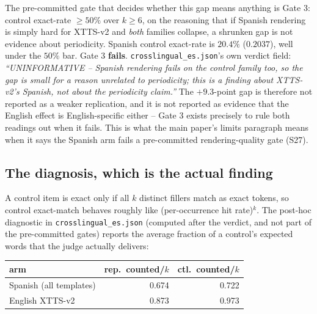 \documentclass[11pt]{article}
\begin{document}
\noindent The pre-committed gate that decides whether this gap means anything
is Gate 3: control exact-rate $\ge 50\%$ over $k\ge6$, on the reasoning that if
Spanish rendering is simply hard for XTTS-v2 and \emph{both} families
collapse, a shrunken gap is not evidence about periodicity. Spanish control
exact-rate is $20.4\%$ ($0.2037$), well under the $50\%$ bar. Gate 3
\textbf{fails}. \texttt{crosslingual\_es.json}'s own verdict field: \emph{
``UNINFORMATIVE -- Spanish rendering fails on the control family too, so the
gap is small for a reason unrelated to periodicity; this is a finding about
XTTS-v2's Spanish, not about the periodicity claim.''} The $+9.3$-point gap is
therefore not reported as a weaker replication, and it is not reported as
evidence that the English effect is English-specific either -- Gate 3 exists
precisely to rule both readings out when it fails. This is what the main
paper's limits paragraph means when it says the Spanish arm fails a
pre-committed rendering-quality gate (S27).

\subsection{The diagnosis, which is the actual finding}

A control item is exact only if all $k$ distinct fillers match as exact
tokens, so control exact-match behaves roughly like (per-occurrence hit
rate)$^k$. The post-hoc diagnostic in \texttt{crosslingual\_es.json} (computed
after the verdict, and not part of the pre-committed gates) reports the
average fraction of a control's expected words that the judge actually
delivers:

\begin{center}
\begin{tabular}{@{}lrr@{}}
\toprule
arm & rep.\ counted/$k$ & ctl.\ counted/$k$ \\
\midrule
Spanish (all templates) & 0.674 & 0.722 \\
English XTTS-v2          & 0.873 & 0.973 \\
\bottomrule
\end{tabular}
\end{center}
\end{document}
